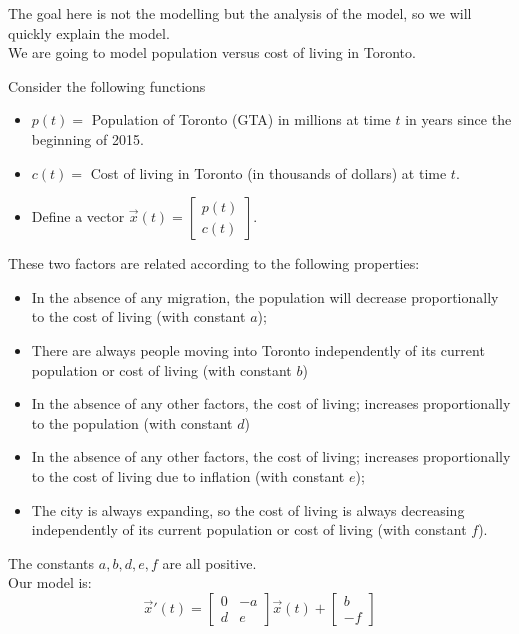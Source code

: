 \begin{example}
The goal here is not the modelling but the analysis of the model, so we will quickly explain the model. \\

We are going to model population versus cost of living in Toronto.


Consider the following functions
\begin{itemize}
\item $p(t) = $ Population of Toronto (GTA) in millions at time $t$ in years since the beginning of 2015.
\item $c(t) = $ Cost of living in Toronto (in thousands of dollars) at time $t$.
\item Define a vector $\vec{x}(t) = \begin{bmatrix} p(t) \\ c(t) \end{bmatrix}$.
\end{itemize}

These two factors are related according to the following properties:
\begin{itemize}
\item In the absence of any migration, the population will decrease proportionally to the cost of living (with constant $a$);
\item There are always people moving into Toronto independently of its current population or cost of living (with constant $b$)
\item In the absence of any other factors, the cost of living; increases proportionally to the population (with constant $d$)
\item In the absence of any other factors, the cost of living; increases proportionally to the cost of living due to inflation (with constant $e$);
\item The city is always expanding, so the cost of living is always decreasing independently of its current population or cost of living (with constant $f$).
\end{itemize}
The constants $a,b,d,e,f$ are all positive. \\

Our model is:
$$
\vec{x}'(t) = 
	\begin{bmatrix}
 		0 & -a \\
 		d & e
	\end{bmatrix}
					\vec{x}(t) + 
	\begin{bmatrix}
		b \\ -f
	\end{bmatrix}
$$
\end{example}

